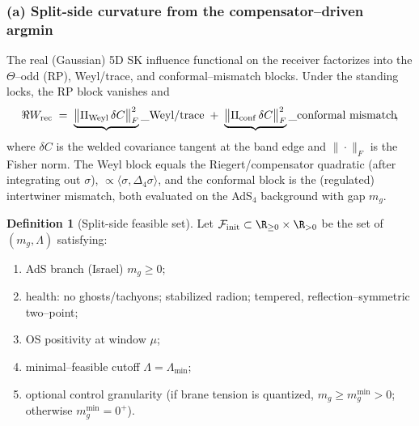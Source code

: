 \documentclass[10pt]{article}
\theoremstyle{definition}
\newtheorem{definition}{Definition}[section]
\theoremstyle{plain}
\begin{document}
\subsubsection*{(a) Split-side curvature from the compensator--driven argmin}
\label{subsubsec:init-curvature}
The real (Gaussian) 5D SK influence functional on the receiver factorizes into the $\Theta$–odd (RP),
Weyl/trace, and conformal–mismatch blocks. Under the standing locks, the RP block vanishes and
\begin{equation}
\label{eq:ReWrec}
\Re W_{\rm rec}\;=\;\underbrace{\big\|\Pi_{\rm Weyl}\,\delta C\big\|_{F}^2}\_{\text{Weyl/trace}}
\;+\;\underbrace{\big\|\Pi_{\rm conf}\,\delta C\big\|_{F}^2}\_{\text{conformal mismatch}}\!,
\end{equation}
where $\delta C$ is the welded covariance tangent at the band edge and $\|\cdot\|_F$ is the Fisher norm.
The Weyl block equals the Riegert/compensator quadratic (after integrating out $\sigma$),
$\propto \langle\sigma,\Delta_4\sigma\rangle$, and the conformal block is the (regulated)
intertwiner mismatch, both evaluated on the AdS$_4$ background with gap $m_g$.

\begin{definition}[Split-side feasible set]
\label{def:feasible-set}
Let $\mathcal F_{\rm init}\subset \R_{\ge 0}\times \R_{>0}$ be the set of $(m_g,\Lambda)$ satisfying:
\begin{enumerate}[label=(\roman*)]
    \item AdS branch (Israel) $m_g\ge 0$; 
    \item health: no ghosts/tachyons; stabilized radion; tempered, reflection–symmetric
two–point;
    \item OS positivity at window $\mu$;
    \item  minimal–feasible cutoff $\Lambda=\Lambda_{\min}$;
    \item optional
control granularity (if brane tension is quantized, $m_g\ge m_g^{\min}>0$; otherwise $m_g^{\min}=0^+$).
\end{enumerate}

\end{definition}
\end{document}
